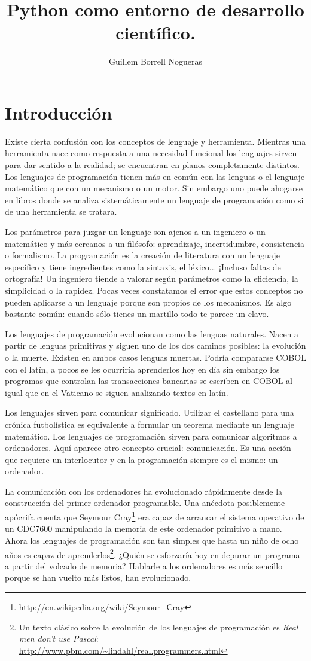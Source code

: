 \documentclass[a4paper,10pt]{article}
\author{Guillem Borrell Nogueras}
\title{Python como entorno de desarrollo científico.}
\begin{document}
\maketitle
\section{Introducción}
Existe cierta confusión con los conceptos de lenguaje y
herramienta. Mientras una herramienta nace como respuesta a una
necesidad funcional los lenguajes sirven para dar sentido a la
realidad; se encuentran en planos completamente distintos. Los
lenguajes de programación tienen más en común con las lenguas o el
lenguaje matemático que con un mecanismo o un motor. Sin embargo uno
puede ahogarse en libros donde se analiza sistemáticamente un lenguaje
de programación como si de una herramienta se tratara.

Los parámetros para juzgar un lenguaje son ajenos a un ingeniero o un
matemático y más cercanos a un filósofo: aprendizaje, incertidumbre,
consistencia o formalismo. La programación es la creación de
literatura con un lenguaje específico y tiene ingredientes como la
sintaxis, el léxico... ¡Incluso faltas de ortografía! Un ingeniero
tiende a valorar según parámetros como la eficiencia, la simplicidad o
la rapidez.  Pocas veces constatamos el error que estos conceptos no
pueden aplicarse a un lenguaje porque son propios de los mecanismos.
Es algo bastante común: cuando sólo tienes un martillo todo te parece
un clavo.

Los lenguajes de programación evolucionan como las lenguas naturales.
Nacen a partir de lenguas primitivas y siguen uno de los dos caminos
posibles: la evolución o la muerte. Existen en ambos casos lenguas
muertas.  Podría compararse COBOL con el latín, a pocos se les
ocurriría aprenderlos hoy en día sin embargo los programas que
controlan las transacciones bancarias se escriben en COBOL al igual
que en el Vaticano se siguen analizando textos en latín.

Los lenguajes sirven para comunicar significado.  Utilizar el
castellano para una crónica futbolística es equivalente a formular un
teorema mediante un lenguaje matemático. Los lenguajes de programación
sirven para comunicar algoritmos a ordenadores. Aquí aparece otro
concepto crucial: comunicación.  Es una acción que requiere un
interlocutor y en la programación siempre es el mismo: un
ordenador. 

La comunicación con los ordenadores ha evolucionado rápidamente desde
la construcción del primer ordenador programable. Una anécdota
posiblemente apócrifa cuenta que Seymour
Cray\footnote{\url{http://en.wikipedia.org/wiki/Seymour_Cray}} era capaz
de arrancar el sistema operativo de un CDC7600 manipulando la memoria
de este ordenador primitivo a mano. Ahora los lenguajes de
programación son tan simples que hasta un niño de ocho años es capaz
de aprenderlos\footnote{Un texto clásico sobre la evolución de los
  lenguajes de programación es \emph{Real men don't use
    Pascal}: \url{http://www.pbm.com/~lindahl/real.programmers.html}}. ¿Quién
se esforzaría hoy en depurar un programa a partir del volcado de
memoria? Hablarle a los ordenadores es más sencillo porque se han
vuelto más listos, han evolucionado.
\end{document}
